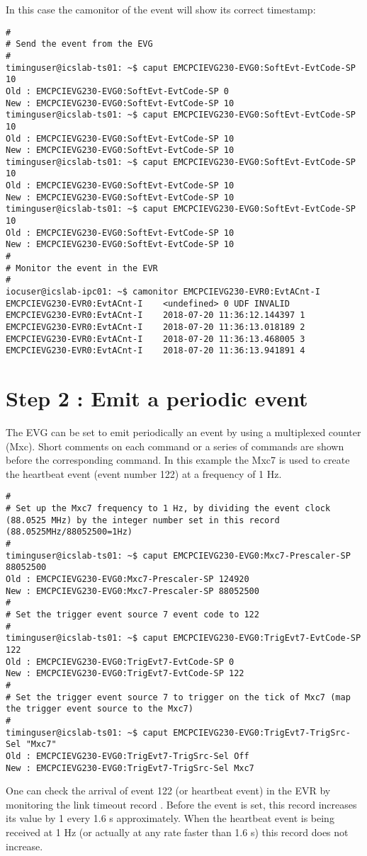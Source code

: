 \documentclass[11pt
  , a4paper
  , article
  , oneside
  , showtrims
]{memoir}
\begin{document}
In this case the camonitor of the event will show its correct timestamp:
\begin{lstlisting}[style=termstyle]
#
# Send the event from the EVG
#
timinguser@icslab-ts01: ~$ caput EMCPCIEVG230-EVG0:SoftEvt-EvtCode-SP 10
Old : EMCPCIEVG230-EVG0:SoftEvt-EvtCode-SP 0
New : EMCPCIEVG230-EVG0:SoftEvt-EvtCode-SP 10
timinguser@icslab-ts01: ~$ caput EMCPCIEVG230-EVG0:SoftEvt-EvtCode-SP 10
Old : EMCPCIEVG230-EVG0:SoftEvt-EvtCode-SP 10
New : EMCPCIEVG230-EVG0:SoftEvt-EvtCode-SP 10
timinguser@icslab-ts01: ~$ caput EMCPCIEVG230-EVG0:SoftEvt-EvtCode-SP 10
Old : EMCPCIEVG230-EVG0:SoftEvt-EvtCode-SP 10
New : EMCPCIEVG230-EVG0:SoftEvt-EvtCode-SP 10
timinguser@icslab-ts01: ~$ caput EMCPCIEVG230-EVG0:SoftEvt-EvtCode-SP 10
Old : EMCPCIEVG230-EVG0:SoftEvt-EvtCode-SP 10
New : EMCPCIEVG230-EVG0:SoftEvt-EvtCode-SP 10
#
# Monitor the event in the EVR
#
iocuser@icslab-ipc01: ~$ camonitor EMCPCIEVG230-EVR0:EvtACnt-I
EMCPCIEVG230-EVR0:EvtACnt-I    <undefined> 0 UDF INVALID
EMCPCIEVG230-EVR0:EvtACnt-I    2018-07-20 11:36:12.144397 1
EMCPCIEVG230-EVR0:EvtACnt-I    2018-07-20 11:36:13.018189 2
EMCPCIEVG230-EVR0:EvtACnt-I    2018-07-20 11:36:13.468005 3
EMCPCIEVG230-EVR0:EvtACnt-I    2018-07-20 11:36:13.941891 4
\end{lstlisting}


\section{Step 2 : Emit a periodic event}
The EVG can be set to emit periodically an event by using a multiplexed counter (Mxc). Short comments on each command or a series of commands are shown before the corresponding command. In this example the Mxc7 is used to create the heartbeat event (event number 122) at a frequency of 1 Hz.
\begin{lstlisting}[style=termstyle]
#
# Set up the Mxc7 frequency to 1 Hz, by dividing the event clock (88.0525 MHz) by the integer number set in this record (88.0525MHz/88052500=1Hz)
#
timinguser@icslab-ts01: ~$ caput EMCPCIEVG230-EVG0:Mxc7-Prescaler-SP 88052500
Old : EMCPCIEVG230-EVG0:Mxc7-Prescaler-SP 124920
New : EMCPCIEVG230-EVG0:Mxc7-Prescaler-SP 88052500
#
# Set the trigger event source 7 event code to 122
#
timinguser@icslab-ts01: ~$ caput EMCPCIEVG230-EVG0:TrigEvt7-EvtCode-SP 122
Old : EMCPCIEVG230-EVG0:TrigEvt7-EvtCode-SP 0
New : EMCPCIEVG230-EVG0:TrigEvt7-EvtCode-SP 122
#
# Set the trigger event source 7 to trigger on the tick of Mxc7 (map the trigger event source to the Mxc7)
#
timinguser@icslab-ts01: ~$ caput EMCPCIEVG230-EVG0:TrigEvt7-TrigSrc-Sel "Mxc7"
Old : EMCPCIEVG230-EVG0:TrigEvt7-TrigSrc-Sel Off
New : EMCPCIEVG230-EVG0:TrigEvt7-TrigSrc-Sel Mxc7
\end{lstlisting}
One can check the arrival of event 122 (or heartbeat event) in the EVR by monitoring the link timeout record . Before the event is set, this record increases its value by 1 every 1.6 s approximately. When the heartbeat event is being received at 1 Hz (or actually at any rate faster than 1.6 s) this record does not increase.
\end{document}
